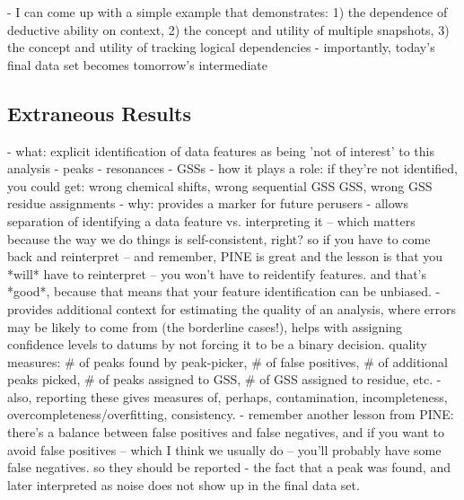  - I can come up with a simple example that demonstrates: 1) the dependence of
   deductive ability on context, 2) the concept and utility of multiple 
   snapshots, 3) the concept and utility of tracking logical dependencies
 - importantly, today's final data set becomes tomorrow's intermediate


\subsection{Extraneous Results}
 - what: explicit identification of data features as being 'not of interest'
   to this analysis
   - peaks
   - resonances
   - GSSs
 - how it plays a role: if they're not identified, you could get: wrong 
   chemical shifts, wrong sequential GSS GSS, wrong GSS residue assignments
 - why: provides a marker for future perusers
 - allows separation of identifying a data feature vs. interpreting it -- which
   matters because the way we do things is self-consistent, right?  
   so if you have to come back and reinterpret -- and remember, PINE is great and the
   lesson is that you *will* have to reinterpret -- you won't have to reidentify
   features.  
   and that's *good*, because that means that your feature identification
   can be unbiased.  
 - provides additional context for estimating the quality of an analysis,
   where errors may be likely to come from (the borderline cases!), helps with
   assigning confidence levels to datums by not forcing it to be a binary 
   decision.  quality measures: \# of peaks found by peak-picker, \# of false
   positives, \# of additional peaks picked, \# of peaks assigned to GSS, 
   \# of GSS assigned to residue, etc.
 - also, reporting these gives measures of, perhaps, contamination,
   incompleteness, overcompleteness/overfitting, consistency.  
 - remember another
   lesson from PINE: there's a balance between false positives and false negatives,
   and if you want to avoid false positives -- which I think we usually do -- 
   you'll probably have some false negatives.  so they should be reported
 - the fact that a peak was found, and later interpreted as noise does 
   not show up in the final data set.



